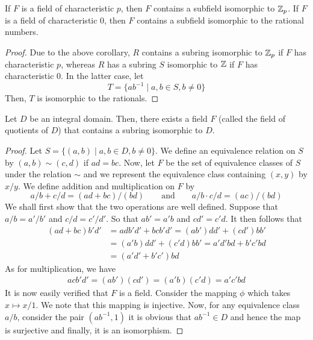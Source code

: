 \begin{theorem}[Steinitz, 1910]
	If $F$ is a field of characteristic $p$, then $F$ contains a subfield isomorphic to $\mathbb{Z}_p$. If $F$ is a field of characteristic $0$, then $F$ contains a subfield isomorphic to the rational numbers.
\end{theorem}
\begin{proof}
	Due to the above corollary, $R$ contains a subring isomorphic to $\mathbb{Z}_p$ if $F$ has characteristic $p$, whereas $R$ has a subring $S$ isomorphic to $\mathbb{Z}$ if $F$ has characteristic $0$. In the latter case, let 
	\begin{equation*}
		T = \{ab^{-1}\mid a,b\in S, b\ne0\}
	\end{equation*}
	Then, $T$ is isomorphic to the rationals.
\end{proof}

\begin{proposition}
	Let $D$ be an integral domain. Then, there exists a field $F$ (called the field of quotients of $D$) that contains a subring isomorphic to $D$.
\end{proposition}
\begin{proof}
	Let $S=\{(a,b)\mid a,b\in D, b\ne0\}$. We define an equivalence relation on $S$ by $(a,b)\sim(c,d)$ if $ad=bc$. Now, let $F$ be the set of equivalence classes of $S$ under the relation $\sim$ and we represent the equivalence class containing $(x,y)$ by $x/y$. We define addition and multiplication on $F$ by
	$$
	a/b+c/d = (ad+bc)/(bd) \qquad \text{and} \qquad a/b\cdot c/d = (ac)/(bd)
	$$
	We shall first show that the two operations are well defined. Suppose that $a/b=a'/b'$ and $c/d=c'/d'$. So that $ab'=a'b$ and $cd'=c'd$. It then follows that 
	\begin{align*}
		(ad+bc)b'd' &= adb'd' + bcb'd' = (ab')dd' + (cd')bb'\\
		&=(a'b)dd' + (c'd)bb' = a'd'bd+b'c'bd\\
		&=(a'd'+b'c')bd
	\end{align*}
	As for multiplication, we have
	\begin{align*}
		acb'd' = (ab')(cd') = (a'b)(c'd) = a'c'bd
	\end{align*}
	It is now easily verified that $F$ is a field. Consider the mapping $\phi$ which takes $x\mapsto x/1$. We note that this mapping is injective. Now, for any equivalence class $a/b$, consider the pair $(ab^{-1},1)$ it is obvious that $ab^{-1}\in D$ and hence the map is surjective and finally, it is an isomorphism.
\end{proof}